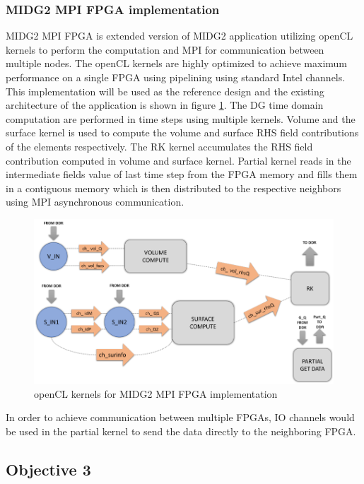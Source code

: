 \documentclass[english,notitlepage]{hgbreport}
\begin{document}
\subsubsection{MIDG2 MPI FPGA implementation}
MIDG2 MPI FPGA is extended version of MIDG2 application utilizing openCL kernels to perform the
computation and MPI for communication between multiple nodes. The openCL kernels are
highly optimized to achieve maximum performance on a single FPGA using pipelining using
standard Intel channels. This implementation will be used as the reference design and
the existing architecture of the application is shown in figure \ref{fig:kernels}.
The DG time domain computation are performed in time steps using multiple kernels.
Volume and the surface kernel is used to compute the volume and surface RHS field
contributions of the elements respectively. The RK kernel accumulates the RHS
field contribution computed in volume and surface kernel. Partial kernel reads in
the intermediate fields value of last time step from the FPGA memory and fills them
in a contiguous memory which is then distributed to the respective neighbors using
MPI asynchronous communication.

\begin{figure}[h]%
    \centering
    \includegraphics[width=1.0\textwidth]{images/kernels}
    \caption{openCL kernels for MIDG2 MPI FPGA implementation}
    \label{fig:kernels}
\end{figure}

In order to achieve communication between multiple FPGAs, IO channels would be used
in the partial kernel to send the data directly to the neighboring FPGA.

\subsection{Objective 3}
\end{document}
